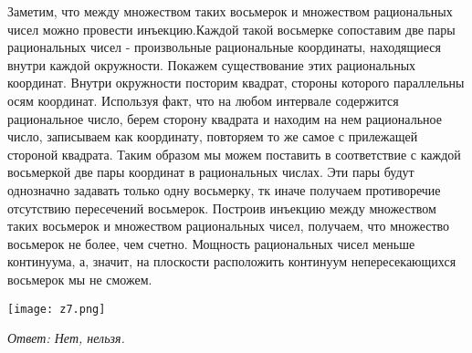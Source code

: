 \documentclass{article}
\begin{document}
Заметим, что между множеством таких восьмерок и множеством рациональных чисел можно провести инъекцию.Каждой такой восьмерке сопоставим две пары рациональных чисел - произвольные рациональные координаты, находящиеся внутри каждой окружности. Покажем существование этих рациональных координат. Внутри окружности посторим квадрат, стороны которого параллельны осям координат. Используя факт, что на любом интервале содержится рациональное число, берем сторону квадрата и находим на нем рациональное число, записываем как координату, повторяем то же самое с прилежащей стороной квадрата. Таким образом мы можем поставить в соответствие с каждой восьмеркой две пары координат в рациональных числах. Эти пары будут однозначно задавать только одну восьмерку, тк иначе получаем противоречие отсутствию пересечений восьмерок. Построив инъекцию между множеством таких восьмерок и множеством рациональных чисел, получаем, что множество восьмерок не более, чем счетно. Мощность рациональных чисел меньше континуума, а, значит, на плоскости расположить континуум непересекающихся восьмерок мы не сможем.
 \newline
 \begin{center}
 \texttt{[image: z7.png]}
\end{center}
\noindent \textit{Ответ: Нет, нельзя.}
\end{document}
